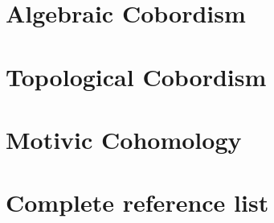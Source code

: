 \documentclass{article}%
\begin{document}
\section{Algebraic Cobordism}

\section{Topological Cobordism}

\section{Motivic Cohomology}


\section{Complete reference list}
\end{document}
